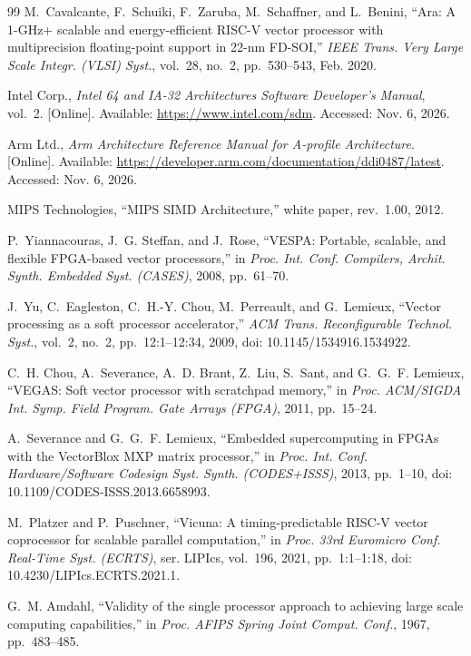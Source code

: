 \documentclass[journal]{IEEEtran}
\begin{document}
\begin{thebibliography}{99}
 M.~Cavalcante, F.~Schuiki, F.~Zaruba, M.~Schaffner, and L.~Benini,
``Ara: A 1-GHz+ scalable and energy-efficient RISC-V vector processor with
multiprecision floating-point support in 22-nm FD-SOI,'' \emph{IEEE Trans. Very
Large Scale Integr. (VLSI) Syst.}, vol.~28, no.~2, pp.~530--543, Feb. 2020.

 Intel Corp., \emph{Intel 64 and IA-32 Architectures Software
Developer's Manual}, vol.~2. [Online]. Available: \url{https://www.intel.com/sdm}.
Accessed: Nov. 6, 2026.

 Arm Ltd., \emph{Arm Architecture Reference Manual for A-profile
Architecture}. [Online]. Available:
\url{https://developer.arm.com/documentation/ddi0487/latest}. Accessed: Nov. 6, 2026.

 MIPS Technologies, ``MIPS SIMD Architecture,'' white paper, rev.~1.00, 2012.

 P.~Yiannacouras, J.~G. Steffan, and J.~Rose, ``VESPA: Portable,
scalable, and flexible FPGA-based vector processors,'' in \emph{Proc. Int. Conf.
Compilers, Archit. Synth. Embedded Syst. (CASES)}, 2008, pp.~61--70.

 J.~Yu, C.~Eagleston, C.~H.-Y. Chou, M.~Perreault, and G.~Lemieux,
``Vector processing as a soft processor accelerator,'' \emph{ACM Trans.
Reconfigurable Technol. Syst.}, vol.~2, no.~2, pp.~12:1--12:34, 2009,
doi: 10.1145/1534916.1534922.

 C.~H. Chou, A.~Severance, A.~D. Brant, Z.~Liu, S.~Sant, and
G.~G.~F. Lemieux, ``VEGAS: Soft vector processor with scratchpad memory,'' in
\emph{Proc. ACM/SIGDA Int. Symp. Field Program. Gate Arrays (FPGA)}, 2011,
pp.~15--24.

 A.~Severance and G.~G.~F. Lemieux, ``Embedded supercomputing in
FPGAs with the VectorBlox MXP matrix processor,'' in \emph{Proc. Int. Conf.
Hardware/Software Codesign Syst. Synth. (CODES+ISSS)}, 2013, pp.~1--10,
doi: 10.1109/CODES-ISSS.2013.6658993.

 M.~Platzer and P.~Puschner, ``Vicuna: A timing-predictable RISC-V
vector coprocessor for scalable parallel computation,'' in \emph{Proc. 33rd Euromicro
Conf. Real-Time Syst. (ECRTS)}, ser. LIPIcs, vol.~196, 2021, pp.~1:1--1:18,
doi: 10.4230/LIPIcs.ECRTS.2021.1.

 G.~M. Amdahl, ``Validity of the single processor approach to
achieving large scale computing capabilities,'' in \emph{Proc. AFIPS Spring Joint
Comput. Conf.}, 1967, pp.~483--485.


\end{thebibliography}
\end{document}

